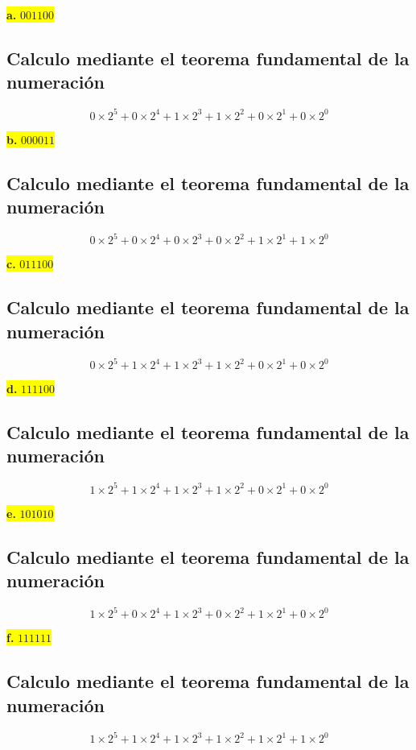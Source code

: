 \documentclass[a4paper,12pt]{article}
\begin{document}
	\begin{center}
	\colorbox{yellow}{{\textbf{a.} $001100$}}
	\subsection*{Calculo mediante el teorema fundamental de la numeración}
	\[
	0\times2^{5} + 0\times2^{4} + 1\times2^{3} + 1\times2^{2} + 0\times2^{1} + 0\times2^{0}
	\]
	\end{center}
	\begin{center}
		\colorbox{yellow}{{\textbf{b.} $000011$}}
		\subsection*{Calculo mediante el teorema fundamental de la numeración}
		\[
		0\times2^{5} + 0\times2^{4} + 0\times2^{3} + 0\times2^{2} + 1\times2^{1} + 1\times2^{0}
		\]
	\end{center}
	\newpage
	\begin{center}
		\colorbox{yellow}{{\textbf{c.} $011100$}}
		\subsection*{Calculo mediante el teorema fundamental de la numeración}
		\[
		0\times2^{5} + 1\times2^{4} + 1\times2^{3} + 1\times2^{2} + 0\times2^{1} + 0\times2^{0}
		\]
	\end{center}
	\begin{center}
		\colorbox{yellow}{{\textbf{d.} $111100$}}
		\subsection*{Calculo mediante el teorema fundamental de la numeración}
		\[
		1\times2^{5} + 1\times2^{4} + 1\times2^{3} + 1\times2^{2} + 0\times2^{1} + 0\times2^{0}
		\]
	\end{center}
	\begin{center}
		\colorbox{yellow}{{\textbf{e.} $101010$}}
		\subsection*{Calculo mediante el teorema fundamental de la numeración}
		\[
		1\times2^{5} + 0\times2^{4} + 1\times2^{3} + 0\times2^{2} + 1\times2^{1} + 0\times2^{0}
		\]
	\end{center}
	\begin{center}
		\colorbox{yellow}{{\textbf{f.} $111111$}}
		\subsection*{Calculo mediante el teorema fundamental de la numeración}
		\[
		1\times2^{5} + 1\times2^{4} + 1\times2^{3} + 1\times2^{2} + 1\times2^{1} + 1\times2^{0}
		\]
	\end{center}
\end{document}
